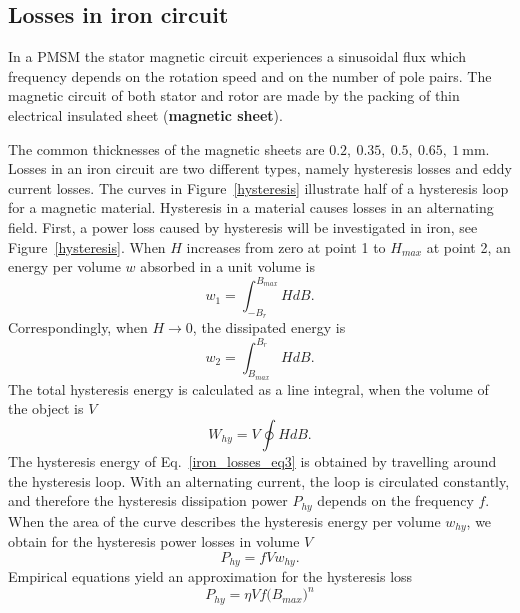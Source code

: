 \documentclass[12pt,a4paper,oneside]{book}
\begin{document}
\begin{onehalfspace}
\subsection{Losses in iron circuit}
In a PMSM the stator magnetic circuit experiences a sinusoidal flux which frequency depends on the rotation speed and on the number of pole pairs. The magnetic circuit of both stator and rotor are made by the packing of thin electrical insulated sheet (\textbf{magnetic sheet}). 

The common thicknesses of the magnetic sheets are $0.2,\ 0.35,\ 0.5,\ 0.65,\ 1\SI{}{\milli\meter}$.
Losses in an iron circuit are two different types, namely hysteresis losses and eddy current losses. The curves in Figure~\ref{hysteresis} illustrate half of a hysteresis loop for a magnetic material. Hysteresis in a material causes losses in an alternating field. First, a power loss caused by hysteresis will be investigated in iron, see Figure~\ref{hysteresis}. When $H$ increases from zero at point 1 to $H_{max}$ at point 2, an energy per volume $w$ absorbed in a unit volume is
\begin{equation}\label{iron_losses_eq1}
	w_1=\int_{-B_r}^{B_{max}}HdB.
\end{equation}
Correspondingly, when $H\rightarrow0$, the dissipated energy is 
\begin{equation}\label{iron_losses_eq2}
	w_2=\int_{B_{max}}^{B_{r}}HdB.
\end{equation}
The total hysteresis energy is calculated as a line integral, when the volume of the object is $V$
\begin{equation}\label{iron_losses_eq3}
	W_{hy} = V\oint{HdB}.
\end{equation}
The hysteresis energy of Eq.~\eqref{iron_losses_eq3} is obtained by travelling around the hysteresis loop. With an alternating current, the loop is circulated constantly, and therefore the hysteresis dissipation power $P_{hy}$ depends on the frequency $f$. When the area of the curve describes the hysteresis energy per volume $w_{hy}$, we obtain for the hysteresis power losses in volume $V$
\begin{equation}\label{iron_losses_eq4}
	P_{hy} = fVw_{hy}.
\end{equation}
Empirical equations yield an approximation for the hysteresis loss
\begin{equation}\label{iron_losses_eq5}
	P_{hy} = \eta V f \Big(B_{max}\Big)^n
\end{equation}
\begin{figure}[H]

\end{figure}
\end{onehalfspace}
\end{document}
